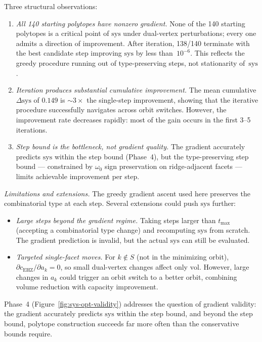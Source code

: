 Three structural observations:
\begin{enumerate}
\item \emph{All 140 starting polytopes have nonzero gradient.}
  None of the 140 starting polytopes is a critical point of $\mathrm{sys}$
  under dual-vertex perturbations; every one admits a direction of improvement.
  After iteration, 138/140 terminate with the best candidate step
  improving $\mathrm{sys}$ by less than~$10^{-6}$.
  This reflects the greedy procedure running out of type-preserving
  steps, not stationarity of~$\mathrm{sys}$.

\item \emph{Iteration produces substantial cumulative improvement.}
  The mean cumulative $\Delta\mathrm{sys}$ of $0.149$ is ${\sim}3\times$
  the single-step improvement, showing that the iterative
  procedure successfully navigates across orbit switches.
  However, the improvement rate decreases rapidly: most of the gain
  occurs in the first 3--5 iterations.

\item \emph{Step bound is the bottleneck, not gradient quality.}
  The gradient accurately predicts $\mathrm{sys}$ within the step bound
  (Phase~4), but the type-preserving step bound --- constrained by
  $\omega_0$ sign preservation on ridge-adjacent facets --- limits
  achievable improvement per step.
\end{enumerate}

\emph{Limitations and extensions.}
The greedy gradient ascent used here preserves the combinatorial type at
each step. Several extensions could push $\mathrm{sys}$ further:
\begin{itemize}
\item \emph{Large steps beyond the gradient regime.}
  Taking steps larger than $t_{\max}$ (accepting a combinatorial type
  change) and recomputing $\mathrm{sys}$ from scratch.
  The gradient prediction is invalid, but the actual $\mathrm{sys}$ can
  still be evaluated.
\item \emph{Targeted single-facet moves.}
  For $k \notin S$ (not in the minimizing orbit), $\partial c_{\mathrm{EHZ}}/\partial a_k = 0$,
  so small dual-vertex changes affect only $\mathrm{vol}$.
  However, large changes in $a_k$ could trigger an orbit switch to a
  better orbit, combining volume reduction with capacity improvement.
\end{itemize}

Phase~4 (Figure~\ref{fig:sys-opt-validity}) addresses the question of
gradient validity: the gradient accurately predicts $\mathrm{sys}$
within the step bound, and beyond the step bound, polytope construction
succeeds far more often than the conservative bounds require.
